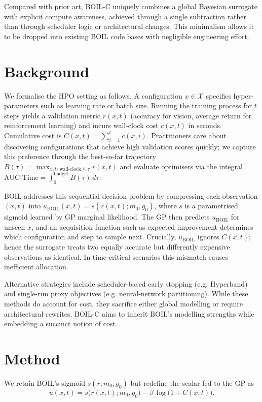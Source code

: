 \documentclass{article} %
\begin{document}
Compared with prior art, BOIL-C uniquely combines a global Bayesian surrogate with explicit compute awareness, achieved through a single subtraction rather than through scheduler logic or architectural changes. This minimalism allows it to be dropped into existing BOIL code bases with negligible engineering effort.

\section{Background}
\label{sec:background}
We formalise the HPO setting as follows. A configuration \(x\in\mathcal{X}\) specifies hyper-parameters such as learning rate or batch size. Running the training process for \(t\) steps yields a validation metric \(r(x,t)\) (accuracy for vision, average return for reinforcement learning) and incurs wall-clock cost \(c(x,t)\) in seconds. Cumulative cost is \(C(x,t)=\sum_{i=1}^{t}c(x,i)\). Practitioners care about discovering configurations that achieve high validation scores quickly; we capture this preference through the best-so-far trajectory \(B(\tau)=\max_{x,t:\,\text{wall-clock}\le\tau} r(x,t)\) and evaluate optimisers via the integral \(\text{AUC-Time}=\int_{0}^{\text{budget}} B(\tau)\,d\tau\).

BOIL addresses this sequential decision problem by compressing each observation \((x,t)\) into \(u_{\mathrm{BOIL}}(x,t)=s(r(x,t);m_0,g_0)\), where \(s\) is a parametrised sigmoid learned by GP marginal likelihood. The GP then predicts \(u_{\mathrm{BOIL}}\) for unseen \(x\), and an acquisition function such as expected improvement determines which configuration and step to sample next. Crucially, \(u_{\mathrm{BOIL}}\) ignores \(C(x,t)\); hence the surrogate treats two equally accurate but differently expensive observations as identical. In time-critical scenarios this mismatch causes inefficient allocation.

Alternative strategies include scheduler-based early stopping (e.g. Hyperband) and single-run proxy objectives (e.g. neural-network partitioning). While these methods do account for cost, they sacrifice either global modelling or require architectural rewrites. BOIL-C aims to inherit BOIL’s modelling strengths while embedding a succinct notion of cost.

\section{Method}
\label{sec:method}
We retain BOIL’s sigmoid \(s(r;m_0,g_0)\) but redefine the scalar fed to the GP as
\[ u(x,t) = s\big(r(x,t); m_0, g_0\big) - \beta\,\log\big(1 + C(x,t)\big). \]
\end{document}
